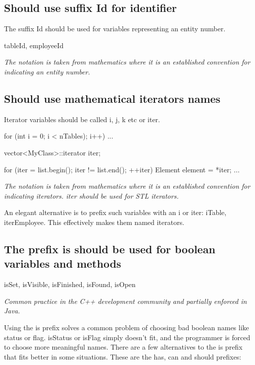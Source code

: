 \documentclass[a4paper,11pt,oneside]{scrbook}
\newcommand{\guideline}[1]{{\subsection{#1}}}
\newcommand{\motivation}[1]{{\normalfont \itshape #1}}
\newcommand{\trcode}[1]{{\normalfont \ttfamily #1}}
\begin{document}
\guideline{Should use suffix \trcode{Id} for identifier}

The suffix \trcode{Id} should be used for variables representing an entity
  number.

\begin{code}
  tableId, employeeId 
\end{code}

\motivation{ 
  The notation is taken from mathematics where it is an established convention
  for indicating an entity number.
}

\guideline{Should use mathematical iterators names}

Iterator variables should be called \trcode{i}, \trcode{j}, \trcode{k} etc
or \trcode{iter}. 

\begin{code}
  for (int i = 0; i < nTables); i++) {
    ...
  }

  vector<MyClass>::iterator iter;

  for (iter = list.begin();  iter != list.end();  ++iter) { 
    Element element = *iter;
    ... 
  } 
\end{code}

\motivation{ 
  The notation is taken from mathematics where it is an established convention
  for indicating iterators. \trcode{iter} should be used for STL iterators.
}

An elegant alternative is to prefix such variables with an i or iter: iTable,
iterEmployee. This effectively makes them named iterators.

\guideline{The prefix \trcode{is} should be used for boolean variables and methods}

\begin{code}
  isSet, isVisible, isFinished, isFound, isOpen 
\end{code}

\motivation{
  Common practice in the C++ development community and partially enforced in Java. 
}

Using the is prefix solves a common problem of choosing bad boolean names like
status or flag. isStatus or isFlag simply doesn't fit, and the programmer is
forced to choose more meaningful names. There are a few alternatives to the
\trcode{is} prefix that fits better in some situations. These are the
\trcode{has}, \trcode{can} and \trcode{should} prefixes:
\end{document}
